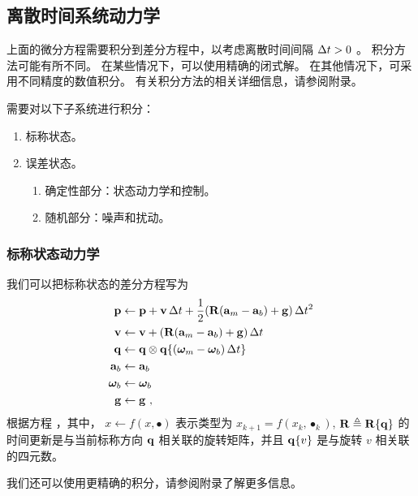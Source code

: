 \subsection{离散时间系统动力学}

上面的微分方程需要积分到差分方程中，以考虑离散时间间隔 $\Delta t>0$ 。
积分方法可能有所不同。 
在某些情况下，可以使用精确的闭式解。 
在其他情况下，可采用不同精度的数值积分。 
有关积分方法的相关详细信息，请参阅附录。

需要对以下子系统进行积分：
%
\begin{enumerate}
\item 标称状态。
\item 误差状态。
\begin{enumerate}
\item 确定性部分：状态动力学和控制。
\item 随机部分：噪声和扰动。
\end{enumerate}
\end{enumerate}

\subsubsection{标称状态动力学}

我们可以把标称状态的差分方程写为
%
\begin{subequations}
%
\begin{align}
{\bf p} &\gets {\bf p} + {\bf v}\, \Delta t + \frac{1}{2}({\bf R}({\bf a}_{m}-{\bf a}_{b})+{\bf g})\, \Delta t ^2\\
{\bf v} &\gets {\bf v} + ({\bf R}({\bf a}_{m}-{\bf a}_{b})+{\bf g})\, \Delta t \\
{\bf q} &\gets {\bf q}\otimes {\bf q}\{({\bm \omega}_{m} - {\bm \omega}_{b})\, \Delta t\} \\
{\bf a}_{b} &\gets {\bf a}_{b} \\
{\bm \omega}_{b} &\gets {\bm \omega}_{b} \\
{\bf g} &\gets {\bf g}~,
\end{align}%
\end{subequations}%
%
根据方程  ，其中， $x\gets f(x,\bullet)$ 表示类型为 $x_{k+1} = f(x_k,\bullet_k)$, ${\bf R}\triangleq{\bf R}\{{\bf q}\}$ 的时间更新是与当前标称方向 ${\bf q}$ 相关联的旋转矩阵，并且 ${\bf q}\{v\}$ 是与旋转 $v$ 相关联的四元数。

我们还可以使用更精确的积分，请参阅附录了解更多信息。



